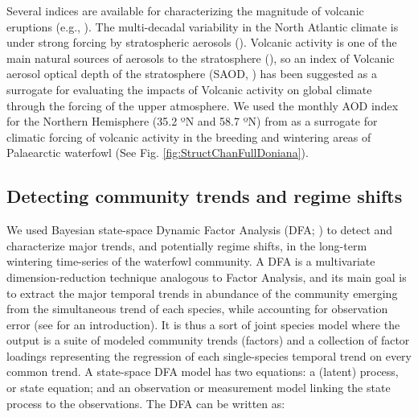 \documentclass[12pt]{article}
\begin{document}
Several indices are available for characterizing the magnitude of volcanic eruptions (e.g., \cite{Crosweller2012,Constantinescu2021}). The multi-decadal variability in the North Atlantic climate is under strong forcing by stratospheric aerosols (\cite{Ottera2010,Booth2012,Knudsen2014}). Volcanic activity is one of the main natural sources of aerosols to the stratosphere (\cite{Ottera2010,Constantinescu2021}), so an index of Volcanic aerosol optical depth of the stratosphere (SAOD, \cite{Booth2012}) has been suggested as a surrogate for evaluating the impacts of Volcanic activity on global climate through the forcing of the upper atmosphere. We used the monthly AOD index for the Northern Hemisphere (35.2 ºN and 58.7 ºN) from \cite{Booth2012} as a surrogate for climatic forcing of volcanic activity in the breeding and wintering areas of Palaearctic waterfowl (See Fig. \ref{fig:StructChanFullDoniana}).\\

\subsection*{Detecting community trends and regime shifts}
\label{subsec:Detecting community trends and regime shifts}

We used Bayesian state-space Dynamic Factor Analysis (DFA; \cite{Almaraz2011,Ward2022}) to detect and characterize major trends, and potentially regime shifts, in the long-term wintering time-series of the waterfowl community. A DFA is a multivariate dimension-reduction technique analogous to Factor Analysis, and its main goal is to extract the major temporal trends in abundance of the community emerging from the simultaneous trend of each species, while accounting for observation error (see \cite{Ward2022} for an introduction). It is thus a sort of joint species model where the output is a suite of modeled community trends (factors) and a collection of factor loadings representing the regression of each single-species temporal trend on every common trend. A state-space DFA model has two equations: a (latent) process, or state equation; and an observation or measurement model linking the state process to the observations. The DFA can be written as:
\end{document}
